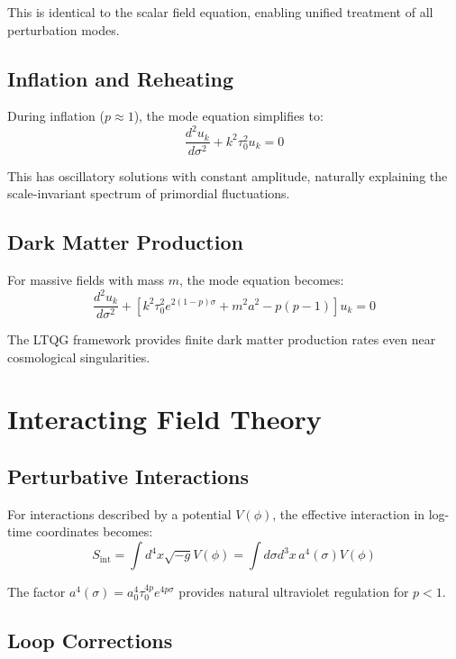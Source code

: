 \documentclass[11pt,a4paper]{article}
\begin{document}
This is identical to the scalar field equation, enabling unified treatment of all perturbation modes.

\subsection{Inflation and Reheating}

During inflation ($p \approx 1$), the mode equation simplifies to:
\begin{equation}
\frac{d^2 u_k}{d\sigma^2} + k^2 \tau_0^2 u_k = 0
\end{equation}

This has oscillatory solutions with constant amplitude, naturally explaining the scale-invariant spectrum of primordial fluctuations.

\subsection{Dark Matter Production}

For massive fields with mass $m$, the mode equation becomes:
\begin{equation}
\frac{d^2 u_k}{d\sigma^2} + \left[k^2 \tau_0^2 e^{2(1-p)\sigma} + m^2 a^2 - p(p-1)\right] u_k = 0
\end{equation}

The LTQG framework provides finite dark matter production rates even near cosmological singularities.

\section{Interacting Field Theory}

\subsection{Perturbative Interactions}

For interactions described by a potential $V(\phi)$, the effective interaction in log-time coordinates becomes:
\begin{equation}
S_{\text{int}} = \int d^4x \sqrt{-g} V(\phi) = \int d\sigma d^3x \, a^4(\sigma) V(\phi)
\end{equation}

The factor $a^4(\sigma) = a_0^4 \tau_0^{4p} e^{4p\sigma}$ provides natural ultraviolet regulation for $p < 1$.

\subsection{Loop Corrections}
\end{document}
